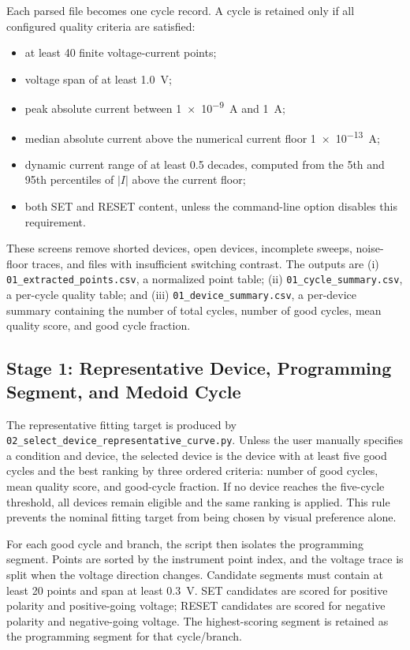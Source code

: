 \documentclass[journal]{IEEEtran}
\begin{document}
Each parsed file becomes one cycle record.  A cycle is retained only if all
configured quality criteria are satisfied:
\begin{itemize}
  \item at least 40 finite voltage-current points;
  \item voltage span of at least \SI{1.0}{\volt};
  \item peak absolute current between \SI{1e-9}{\ampere} and
        \SI{1}{\ampere};
  \item median absolute current above the numerical current floor
        \SI{1e-13}{\ampere};
  \item dynamic current range of at least 0.5 decades, computed from the
        5th and 95th percentiles of $|I|$ above the current floor;
  \item both SET and RESET content, unless the command-line option disables
        this requirement.
\end{itemize}

These screens remove shorted devices, open devices, incomplete sweeps,
noise-floor traces, and files with insufficient switching contrast.  The
outputs are (i) \texttt{01\_extracted\_points.csv}, a normalized point table;
(ii) \texttt{01\_cycle\_summary.csv}, a per-cycle quality table; and
(iii) \texttt{01\_device\_summary.csv}, a per-device summary containing the
number of total cycles, number of good cycles, mean quality score, and good
cycle fraction.

\subsection{Stage 1: Representative Device, Programming Segment, and Medoid Cycle}
\label{sec:stage1}

The representative fitting target is produced by
\texttt{02\_select\_device\_representative\_curve.py}.  Unless the user
manually specifies a condition and device, the selected device is the device
with at least five good cycles and the best ranking by three ordered criteria:
number of good cycles, mean quality score, and good-cycle fraction.  If no
device reaches the five-cycle threshold, all devices remain eligible and the
same ranking is applied.  This rule prevents the nominal fitting target from
being chosen by visual preference alone.

For each good cycle and branch, the script then isolates the programming
segment.  Points are sorted by the instrument point index, and the voltage
trace is split when the voltage direction changes.  Candidate segments must
contain at least 20 points and span at least \SI{0.3}{\volt}.  SET candidates
are scored for positive polarity and positive-going voltage; RESET candidates
are scored for negative polarity and negative-going voltage.  The
highest-scoring segment is retained as the programming segment for that
cycle/branch.
\end{document}
